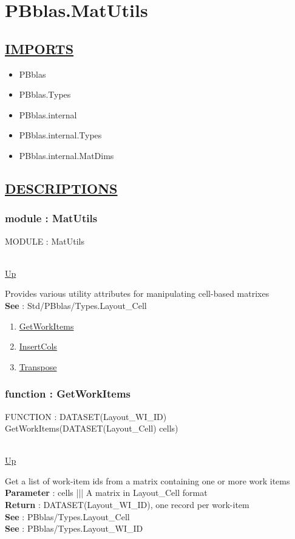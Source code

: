 \chapter*{PBblas.MatUtils}
\hypertarget{PBblas.MatUtils}{}

\section*{\underline{IMPORTS}}
\begin{itemize}
\item PBblas
\item PBblas.Types
\item PBblas.internal
\item PBblas.internal.Types
\item PBblas.internal.MatDims
\end{itemize}

\section*{\underline{DESCRIPTIONS}}
\subsection*{module : MatUtils}
\hypertarget{ecldoc:PBblas.MatUtils}{MODULE : MatUtils} \\
\hyperlink{ecldoc:}{Up} \\
\par
Provides various utility attributes for manipulating cell-based matrixes \\
\textbf{See} : Std/PBblas/Types.Layout\_Cell \\
\begin{enumerate}
\item \hyperlink{ecldoc:pbblas.matutils.getworkitems}{GetWorkItems}
\item \hyperlink{ecldoc:pbblas.matutils.insertcols}{InsertCols}
\item \hyperlink{ecldoc:pbblas.matutils.transpose}{Transpose}
\end{enumerate}
\subsection*{function : GetWorkItems}
\hypertarget{ecldoc:pbblas.matutils.getworkitems}{FUNCTION : DATASET(Layout\_WI\_ID) GetWorkItems(DATASET(Layout\_Cell) cells)} \\
\hyperlink{ecldoc:PBblas.MatUtils}{Up} \\
\par
Get a list of work-item ids from a matrix containing one or more work items \\
\textbf{Parameter} : cells ||| A matrix in Layout\_Cell format \\
\textbf{Return} : DATASET(Layout\_WI\_ID), one record per work-item \\
\textbf{See} : PBblas/Types.Layout\_Cell \\
\textbf{See} : PBblas/Types.Layout\_WI\_ID \\
